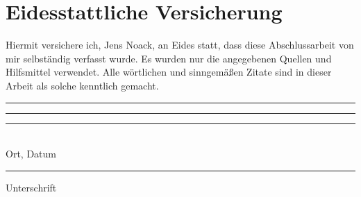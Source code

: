 \documentclass[12pt,a4paper]{report}
\begin{document}
\chapter*{Eidesstattliche Versicherung} %
Hiermit versichere ich, Jens Noack, an Eides statt, dass diese Abschlussarbeit von mir selbständig verfasst wurde. Es wurden nur die angegebenen Quellen und Hilfsmittel verwendet. Alle wörtlichen und sinngemäßen Zitate sind in dieser Arbeit als solche kenntlich gemacht.
\\[2cm]
\noindent\rule{0.35\textwidth}{0.3pt}\rule{0.2\textwidth}{0pt}\rule{0.45\textwidth}{0.3pt}
\\Ort, Datum\rule{0.418\textwidth}{0pt}Unterschrift
\end{document}
